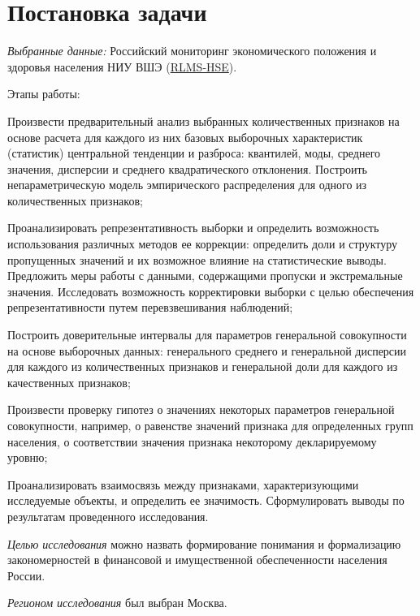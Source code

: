 \documentclass[12pt]{report}
\begin{document}

\boldmath
\tableofcontents
\newpage
\pagestyle{fancy}

\fancyhead[C]{\currentname}

\section{Постановка задачи}
\par 
\emph{Выбранные данные:} Российский мониторинг экономического положения и здоровья населения НИУ ВШЭ (\href{https://www.hse.ru/rlms/spss}{RLMS-HSE}).
\par
Этапы работы:
\begin{enumerate*}
    \item Произвести предварительный анализ выбранных количественных признаков на основе расчета для каждого из них базовых выборочных характеристик (статистик) центральной тенденции и разброса: квантилей, моды, среднего значения, дисперсии и среднего квадратического отклонения. Построить непараметрическую модель эмпирического распределения для одного из количественных признаков;
    \item Проанализировать репрезентативность выборки и определить возможность использования различных методов ее коррекции: определить доли и структуру пропущенных значений и их возможное влияние на статистические выводы. Предложить меры работы с данными, содержащими пропуски и экстремальные значения. Исследовать возможность корректировки выборки с целью обеспечения репрезентативности путем перевзвешивания наблюдений;
    \item Построить доверительные интервалы для параметров генеральной совокупности на основе выборочных данных: генерального среднего и генеральной дисперсии для каждого из количественных признаков и генеральной доли для каждого из качественных признаков;
    \item Произвести проверку гипотез о значениях некоторых параметров генеральной совокупности, например, о равенстве значений признака для определенных групп населения, о соответствии значения признака некоторому декларируемому уровню;
    \item Проанализировать взаимосвязь между признаками, характеризующими исследуемые объекты, и определить ее значимость. Сформулировать выводы по результатам проведенного исследования.
\end{enumerate*}
\par
\emph{Целью исследования} можно назвать формирование понимания и формализацию закономерностей в финансовой и имущественной обеспеченности населения России.
\par 
\emph{Регионом исследования} был выбран Москва.
\newpage
\end{document}
